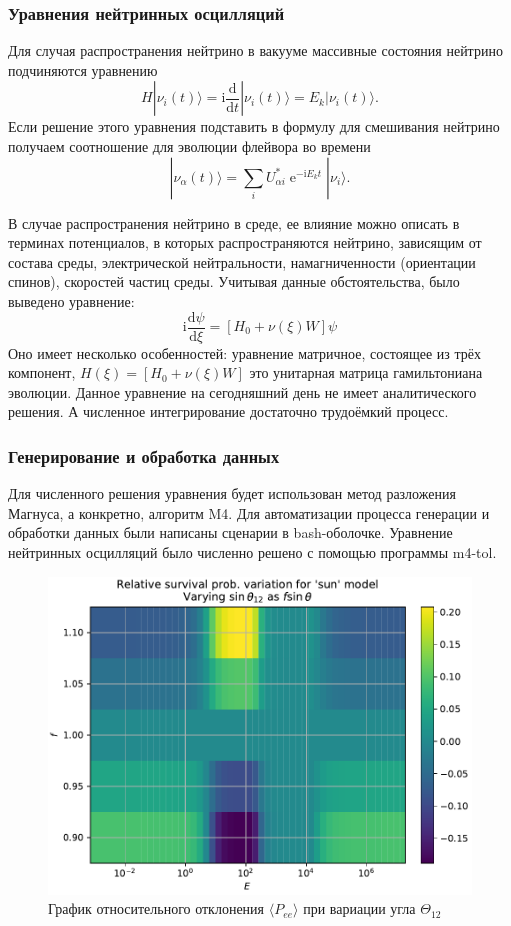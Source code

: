 \documentclass[utf8,9pt,mathserif,usepdftitle=false]{beamer}
\newcommand{\dd}{\mathrm{d}}
\renewcommand{\exp}{\operatorname{e}}
\renewcommand{\imath}{\mathrm{i}}
\begin{document}
\begin{frame}
	\frametitle{Уравнения нейтринных осцилляций}%
    Для случая распространения нейтрино в вакууме массивные состояния нейтрино подчиняются уравнению
    \begin{equation}
        H|\nu_{i}(t)\rangle=\imath\frac{\dd}{\dd t}|\nu_{i}(t)\rangle=
        E_{k}|\nu_{i}(t)\rangle.
    \end{equation}
    Если решение этого уравнения подставить в формулу для смешивания нейтрино получаем соотношение для эволюции флейвора во времени
    \begin{equation}
        |\nu_{\alpha}(t)\rangle=\sum_{i}U_{\alpha i}^{*}\exp^{-\imath E_{k}t}|\nu_{i}\rangle.
    \end{equation}

    В случае распространения нейтрино в среде, ее влияние можно описать в терминах потенциалов, в
  которых распространяются нейтрино, зависящим от состава среды, электрической
  нейтральности, намагниченности (ориентации спинов), скоростей частиц
  среды. Учитывая данные обстоятельства, было выведено уравнение:
	\begin{equation}\label{eq:2}
		\imath\frac{\dd\psi}{\dd\xi}=[H_{0}+\nu(\xi)W]\psi
	\end{equation}
	Оно имеет несколько особенностей: уравнение матричное, состоящее из трёх
  компонент, \(H(\xi)=[H_{0}+\nu(\xi)W]\) это унитарная матрица гамильтониана
  эволюции.  Данное уравнение на сегодняшний день не имеет аналитического
  решения. А численное интегрирование достаточно трудоёмкий процесс.
\end{frame}

\begin{frame}
	\frametitle{Генерирование и обработка данных}%
  Для численного решения уравнения будет использован метод разложения Магнуса, а конкретно, алгоритм M4.
  Для автоматизации процесса генерации и обработки данных были написаны сценарии в bash-оболочке. Уравнение нейтринных осцилляций было численно решено с помощью программы m4-tol.
\end{frame}

\begin{frame}
  \begin{figure}[h]
		\centering
		\includegraphics[width=0.8\linewidth]{sun-in-ang12}
		\caption{График относительного отклонения \(\langle P_{ee}\rangle\) при вариации угла \(\Theta_{12}\) }
	\end{figure}
\end{frame}
\end{document}
